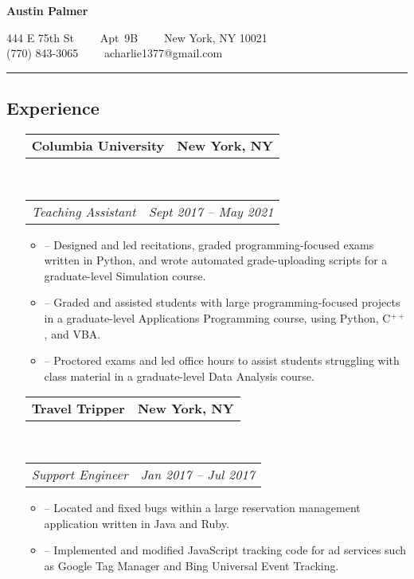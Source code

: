 \documentclass[10.5pt,letterpaper]{article}
\makeatletter
\newenvironment{shortlist}
{\setlength{\linewidth}{0.9\linewidth}
\begin{itemize}
}
{\end{itemize}}
\newcommand{\headerrow}[2]
{\begin{tabular*}{\linewidth}{l@{\extracolsep{\fill}}r}
	#1 &
	#2 \\
\end{tabular*}}
\makeatother
\begin{document}
\begin{center}
{\LARGE \textbf{Austin Palmer}}
\vspace{0.2em}


444 E 75th St\ \ \textbullet
\ \ Apt\ 9B\ \ \textbullet
\ \ New York, NY 10021
\\
(770) 843-3065\ \ \textbullet
\ \ acharlie1377@gmail.com
\end{center}

\hrule
\vspace{-0.4em}


\subsection*{Experience}

\begin{itemize}
	\parskip=0.1em

    \item[]
    \headerrow
        {\textbf{Columbia University}}
        {\textbf{New York, NY}}
    \\
    \headerrow
        {\emph{Teaching Assistant}}
        {\emph{Sept 2017 -- May 2021}}
    \begin{shortlist}
        \item[--]
        Designed and led recitations, graded programming-focused exams written in Python, and wrote
        automated grade-uploading scripts for a graduate-level Simulation course.
        \item[--]
        Graded and assisted students with large programming-focused projects in a graduate-level Applications Programming course, using
        Python, C$^{++}$, and VBA.
        \item[--]
        Proctored exams and led office hours to assist students struggling with class material in a graduate-level Data Analysis course.
    \end{shortlist}

    \item[]
	\headerrow
		{\textbf{Travel Tripper}}
        {\textbf{New York, NY}}
	\\
	\headerrow
		{\emph{Support Engineer}}
		{\emph{Jan 2017 -- Jul 2017}}
    \begin{shortlist}
        \item[--]
        Located and fixed bugs within a large reservation management application written in Java
        and Ruby.

        \item[--]
        Implemented and modified JavaScript tracking code for ad services such as Google Tag
        Manager and Bing Universal Event Tracking.
    \end{shortlist}


\end{itemize}
\end{document}
